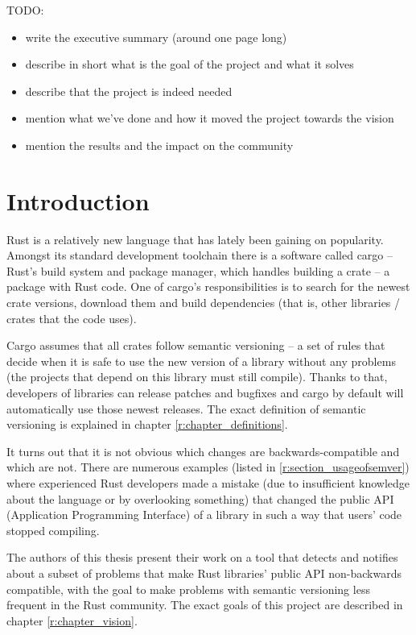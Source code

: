 \documentclass[licencjacka,en]{pracamgr}
\begin{document}
TODO:
\begin{itemize}
	\item write the executive summary (around one page long)
	\item describe in short what is the goal of the project and what it solves
	\item describe that the project is indeed needed
	\item mention what we've done and how it moved the project towards the vision
	\item mention the results and the impact on the community
\end{itemize}

\chapter*{Introduction}

Rust is a relatively new language that has lately been gaining on popularity. Amongst its standard
development toolchain there is a software called cargo -- Rust's build system and package manager,
which handles building a crate -- a package with Rust code. One of cargo's responsibilities is to
search for the newest crate versions, download them and build dependencies (that is, other
libraries / crates that the code uses).

Cargo assumes that all crates follow semantic versioning -- a set of rules that decide when it is
safe to use the new version of a library without any problems (the projects that depend on this
library must still compile). Thanks to that, developers of libraries can release patches and
bugfixes and cargo by default will automatically use those newest releases. The exact definition of
semantic versioning is explained in chapter \ref{r:chapter_definitions}.

It turns out that it is not obvious which changes are backwards-compatible and which are not.
There are numerous examples (listed in \ref{r:section_usageofsemver}) where experienced Rust
developers made a mistake (due to insufficient knowledge about the language or by overlooking
something) that changed the public API (Application Programming Interface) of a library in such
a way that users' code stopped compiling.

The authors of this thesis present their work on a tool that detects and notifies about a subset of
problems that make Rust libraries' public API non-backwards compatible, with the goal to make
problems with semantic versioning less frequent in the Rust community. The exact goals of this
project are described in chapter \ref{r:chapter_vision}.
\end{document}
